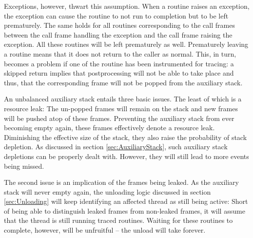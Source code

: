 Exceptions, however, thwart this assumption. When a routine raises an 
exception, the exception can cause the routine to not run to completion 
but to be left prematurely. The same holds for all routines corresponding
to the call frames between the call frame handling the exception and the
call frame raising the exception. All these routines will be left prematurely
as well. Prematurely leaving a routine means that it does not return to the
caller as normal. This, in turn, becomes a problem if one of the routine has 
been instrumented for tracing: a skipped return implies that postprocessing 
will not be able to take place and thus, that the corresponding frame will
not be popped from the auxiliary stack.

An unbalanced auxiliary stack entails three basic issues. The least of 
which is a resource leak: The un-popped frames will remain on the stack
and new frames will be pushed atop of these frames. Preventing the auxiliary
stack from ever becoming empty again, these frames effectively denote a
resource leak. Diminishing the effective size of the stack, they also raise
the probability of stack depletion. As discussed in section \ref{sec:AuxiliaryStack}, such 
auxiliary stack depletions can be properly dealt with. However, they will
still lead to more events being missed.

The second issue is an implication of the frames being leaked. As the
auxiliary stack will never empty again, the unloading logic discussed in 
section \ref{sec:Unloading} will keep identifying an affected thread as still being active: Short
of being able to distinguish leaked frames from non-leaked frames, it
will assume that the thread is still running traced routines. Waiting for
these routines to complete, however, will be unfruitful -- the unload will
take forever.

